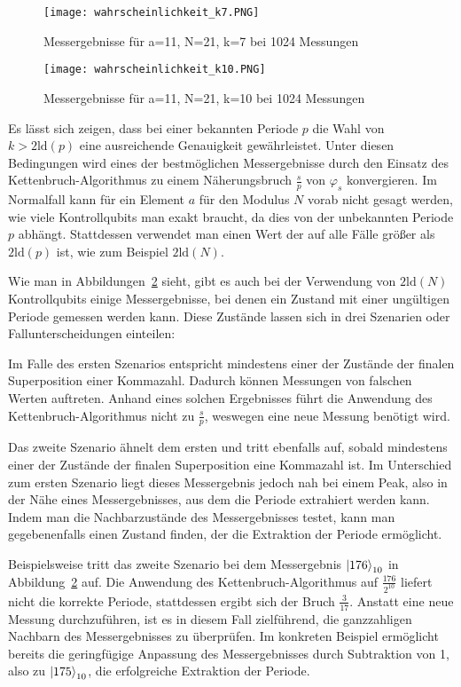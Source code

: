 \begin{figure}[H]
    \centering
    \texttt{[image: wahrscheinlichkeit\_k7.PNG]}
    \caption{Messergebnisse für a=11, N=21, k=7 bei 1024 Messungen}
    \label{fig:Messung7k}
\end{figure}
\begin{figure}[H]
    \centering
    \texttt{[image: wahrscheinlichkeit\_k10.PNG]}
    \caption{Messergebnisse für a=11, N=21, k=10 bei 1024 Messungen}
    \label{fig:Messung10k}
\end{figure}

Es lässt sich zeigen, dass bei einer bekannten Periode \(p\) die Wahl von \(k > 2\text{ld}(p)\) 
eine ausreichende Genauigkeit gewährleistet. 
Unter diesen Bedingungen wird eines der bestmöglichen Messergebnisse durch den Einsatz des Kettenbruch-Algorithmus zu einem Näherungsbruch \(\frac{s}{p}\) von \(\varphi_s\) konvergieren.
Im Normalfall kann für ein Element \(a\) für den Modulus \(N\) vorab nicht gesagt werden, 
wie viele Kontrollqubits man exakt braucht, 
da dies von der unbekannten Periode \(p\) abhängt.
Stattdessen verwendet man einen Wert der auf alle Fälle größer als \(2\text{ld}(p)\) ist, 
wie zum Beispiel \(2\text{ld}(N)\).~\cite{Shor_1997,mosca1999hidden}

Wie man in Abbildungen~\ref{fig:Messung10k} sieht, 
gibt es auch bei der Verwendung von \(2\text{ld}(N)\) Kontrollqubits einige Messergebnisse, 
bei denen ein Zustand mit einer ungültigen Periode gemessen werden kann.
Diese Zustände lassen sich in drei Szenarien oder Fallunterscheidungen einteilen:

Im Falle des ersten Szenarios 
entspricht mindestens einer der Zustände der finalen Superposition einer Kommazahl.
Dadurch können Messungen von falschen Werten auftreten.
Anhand eines solchen Ergebnisses führt die Anwendung des Kettenbruch-Algorithmus nicht zu \(\frac{s}{p}\), 
weswegen eine neue Messung benötigt wird.

Das zweite Szenario ähnelt dem ersten und tritt ebenfalls auf, 
sobald mindestens einer der Zustände der finalen Superposition eine Kommazahl ist. 
Im Unterschied zum ersten Szenario liegt dieses Messergebnis jedoch nah bei einem Peak, 
also in der Nähe eines Messergebnisses, aus dem die Periode extrahiert werden kann. 
Indem man die Nachbarzustände des Messergebnisses testet, kann man gegebenenfalls einen Zustand finden, 
der die Extraktion der Periode ermöglicht.

Beispielsweise tritt das zweite Szenario bei dem Messergebnis \(\ket{176}_{10}\) in Abbildung~\ref{fig:Messung10k} auf.
Die Anwendung des Kettenbruch-Algorithmus auf \(\frac{176}{2^{10}}\) 
liefert nicht die korrekte Periode, stattdessen ergibt sich der Bruch \(\frac{3}{17}\). 
Anstatt eine neue Messung durchzuführen,
ist es in diesem Fall zielführend, 
die ganzzahligen Nachbarn des Messergebnisses zu überprüfen.
Im konkreten Beispiel ermöglicht bereits die geringfügige Anpassung des Messergebnisses durch Subtraktion von 1, 
also zu \(\ket{175}_{10}\), 
die erfolgreiche Extraktion der Periode.

